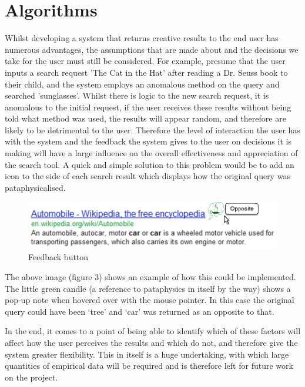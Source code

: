 \section{Algorithms}

Whilst developing a system that returns creative results to the end user has numerous advantages, the assumptions that are made about and the decisions we take for the user must still be considered. For example, presume that the user inputs a search request 'The Cat in the Hat' after reading a Dr. Seuss book to their child, and the system employs an anomalous method on the query and searched 'sunglasses'. Whilst there is logic to the new search request, it is anomalous to the initial request, if the user receives these results without being told what method was used, the results will appear random, and therefore are likely to be detrimental to the user. Therefore the level of interaction the user has with the system and the feedback the system gives to the user on decisions it is making will have a large influence on the overall effectiveness and appreciation of the search tool. A quick and simple solution to this problem would be to add an icon to the side of each search result which displays how the original query was pataphysicalised.

\begin{figure}[htb] %
  \centering
  \includegraphics[width=\linewidth]{images/resultexample}
\caption[Feedback button]{Feedback button}
\label{fig:feedback}
\end{figure}

The above image (figure 3) shows an example of how this could be implemented. The little green candle (a reference to pataphysics in itself by the way) shows a pop-up note when hovered over with the mouse pointer. In this case the original query could have been ‘tree’ and ‘car’ was returned as an opposite to that.

In the end, it comes to a point of being able to identify which of these factors will affect how the user perceives the results and which do not, and therefore give the system greater flexibility. This in itself is a huge undertaking, with which large quantities of empirical data will be required and is therefore left for future work on the project.

